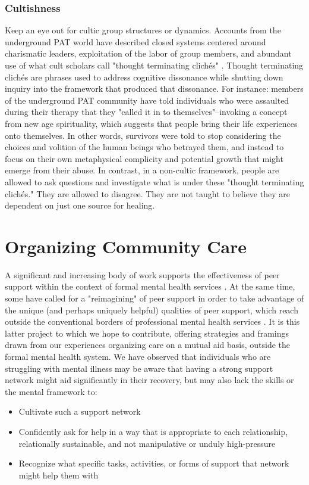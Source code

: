 \documentclass[12pt,letterpaper]{book}
\begin{document}
\subsubsection*{Cultishness}
Keep an eye out for cultic group structures or dynamics. Accounts from the underground PAT world have described closed systems centered around charismatic leaders, exploitation of the labor of group members, and abundant use of what cult scholars call "thought terminating clichés" \cite{powerTrip,thoughtTerminating}. Thought terminating clichés are phrases used to address cognitive dissonance while shutting down inquiry into the framework that produced that dissonance. For instance: members of the underground PAT community have told individuals who were assaulted during their therapy that they "called it in to themselves"–invoking a concept from new age spirituality, which suggests that people bring their life experiences onto themselves. In other words, survivors were told to stop considering the choices and volition of the human beings who betrayed them, and instead to focus on their own metaphysical complicity and potential growth that might emerge from their abuse. In contrast, in a non-cultic framework, people are allowed to ask questions and investigate what is under these "thought terminating clichés." They are allowed to disagree. They are not taught to believe they are dependent on just one source for healing. 
\section{Organizing Community Care}
\label{sec:organizingcare}
A significant and increasing body of work supports the effectiveness of peer support within the context of formal mental health services \cite{shalaby2020peer}. At the same time, some have called for a "reimagining" of peer support in order to take advantage of the unique (and perhaps uniquely helpful) qualities of peer support, which reach outside the conventional borders of professional mental health services \cite{gillard2019peer}. It is this latter project to which we hope to contribute, offering strategies and framings drawn from our experiences organizing care on a mutual aid basis, outside the formal mental health system. We have observed that individuals who are struggling with mental illness may be aware that having a strong support network might aid significantly in their recovery, but may also lack the skills or the mental framework to:
\begin{itemize}
	\item Cultivate such a support network
	\item Confidently ask for help in a way that is appropriate to each relationship, relationally sustainable, and not manipulative or unduly high-pressure
	\item Recognize what specific tasks, activities, or forms of support that network might help them with
\end{itemize}
\end{document}
